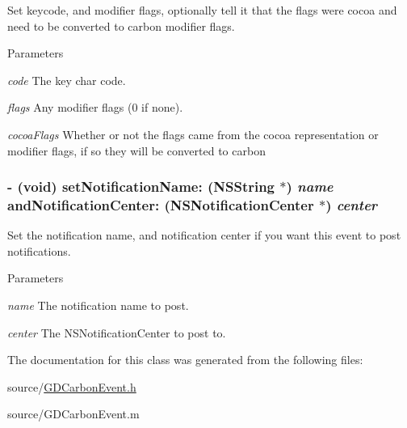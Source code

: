 Set keycode, and modifier flags, optionally tell it that the flags were cocoa and need to be converted to carbon modifier flags. 
\begin{DoxyParams}{Parameters}
\item[{\em code}]The key char code. \item[{\em flags}]Any modifier flags (0 if none). \item[{\em cocoaFlags}]Whether or not the flags came from the cocoa representation or modifier flags, if so they will be converted to carbon \end{DoxyParams}
\hypertarget{interface_g_d_carbon_event_a33e3feb0ec56180d02e170e8bf213b6c}{
\subsubsection[{setNotificationName:andNotificationCenter:}]{\setlength{\rightskip}{0pt plus 5cm}-\/ (void) setNotificationName: ({\bf NSString} $\ast$) {\em name}\/ andNotificationCenter: (NSNotificationCenter $\ast$) {\em center}}}
\label{interface_g_d_carbon_event_a33e3feb0ec56180d02e170e8bf213b6c}


Set the notification name, and notification center if you want this event to post notifications. 
\begin{DoxyParams}{Parameters}
\item[{\em name}]The notification name to post. \item[{\em center}]The NSNotificationCenter to post to. \end{DoxyParams}


The documentation for this class was generated from the following files:\begin{DoxyCompactItemize}
\item 
source/\hyperlink{_g_d_carbon_event_8h}{GDCarbonEvent.h}\item 
source/GDCarbonEvent.m\end{DoxyCompactItemize}
